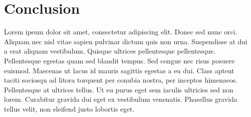 %
%
%
%

\chapter{Conclusion}
\label{cha:conclusion} Lorem ipsum dolor sit amet, consectetur adipiscing elit. Donec
sed nunc orci. Aliquam nec nisl vitae sapien pulvinar dictum quis non urna. Suspendisse
at dui a erat aliquam vestibulum. Quisque ultrices pellentesque pellentesque. Pellentesque
egestas quam sed blandit tempus. Sed congue nec risus posuere euismod. Maecenas ut
lacus id mauris sagittis egestas a eu dui. Class aptent taciti sociosqu ad
litora torquent per conubia nostra, per inceptos himenaeos. Pellentesque at
ultrices tellus. Ut eu purus eget sem iaculis ultricies sed non lorem. Curabitur
gravida dui eget ex vestibulum venenatis. Phasellus gravida tellus velit, non
eleifend justo lobortis eget.